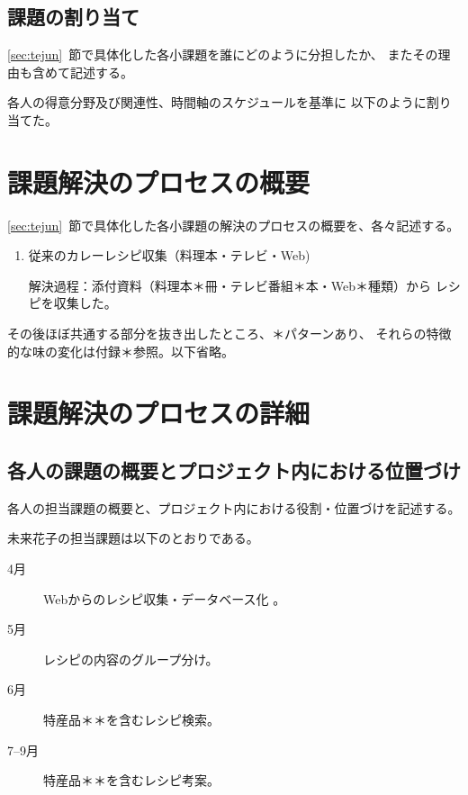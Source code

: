 \documentclass[openany,11pt,papersize]{jsbook}
\begin{document}

\section{課題の割り当て}
\begin{hissu}
\ref{sec:tejun}~節で具体化した各小課題を誰にどのように分担したか、
またその理由も含めて記述する。
\end{hissu}

各人の得意分野及び関連性、時間軸のスケジュールを基準に
以下のように割り当てた。


\chapter{課題解決のプロセスの概要}
\begin{hissu}
\ref{sec:tejun}~節で具体化した各小課題の解決のプロセスの概要を、各々記述する。
\end{hissu}

\begin{enumerate}
 \item 従来のカレーレシピ収集（料理本・テレビ・Web) 
\par 解決過程：添付資料（料理本＊冊・テレビ番組＊本・Web＊種類）から
     レシピを収集した。 
\end{enumerate}


その後ほぼ共通する部分を抜き出したところ、＊パターンあり、
それらの特徴的な味の変化は付録＊参照。以下省略。




\chapter{課題解決のプロセスの詳細}

\section{各人の課題の概要とプロジェクト内における位置づけ}
\begin{hissu}
各人の担当課題の概要と、プロジェクト内における役割・位置づけを記述する。
\end{hissu}

未来花子の担当課題は以下のとおりである。 
\begin{description}
 \item[4月] Webからのレシピ収集・データベース化 。
 \item[5月] レシピの内容のグループ分け。
 \item[6月] 特産品＊＊を含むレシピ検索。
 \item[7--9月]特産品＊＊を含むレシピ考案。
\end{description}
\end{document}
